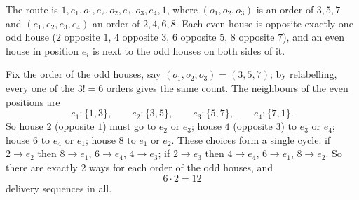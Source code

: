 The route is $1,e_1,o_1,e_2,o_2,e_3,o_3,e_4,1$, where $(o_1,o_2,o_3)$ is an order of $3,5,7$ and $(e_1,e_2,e_3,e_4)$ an order of $2,4,6,8$. Each even house is opposite exactly one odd house ($2$ opposite $1$, $4$ opposite $3$, $6$ opposite $5$, $8$ opposite $7$), and an even house in position $e_i$ is next to the odd houses on both sides of it.

Fix the order of the odd houses, say $(o_1,o_2,o_3)=(3,5,7)$; by relabelling, every one of the $3!=6$ orders gives the same count. The neighbours of the even positions are
\[
e_1:\{1,3\},\qquad e_2:\{3,5\},\qquad e_3:\{5,7\},\qquad e_4:\{7,1\}.
\]
So house $2$ (opposite $1$) must go to $e_2$ or $e_3$; house $4$ (opposite $3$) to $e_3$ or $e_4$; house $6$ to $e_4$ or $e_1$; house $8$ to $e_1$ or $e_2$. These choices form a single cycle: if $2\to e_2$ then $8\to e_1$, $6\to e_4$, $4\to e_3$; if $2\to e_3$ then $4\to e_4$, $6\to e_1$, $8\to e_2$. So there are exactly $2$ ways for each order of the odd houses, and
\[
6\cdot2=\boxed{12}
\]
delivery sequences in all.
